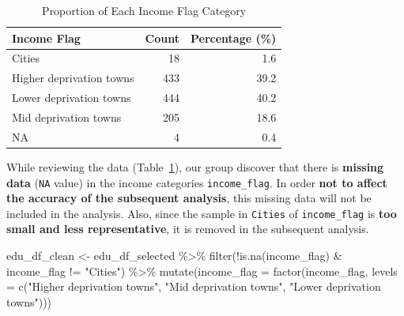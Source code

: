 \documentclass[11pt,en]{../tex/elegantpaper}
\newenvironment{Shaded}{\begin{snugshade}}{\end{snugshade}}
\newcommand{\AttributeTok}[1]{\textcolor[rgb]{0.77,0.63,0.00}{#1}}
\newcommand{\FunctionTok}[1]{\textcolor[rgb]{0.00,0.00,0.81}{#1}}
\newcommand{\NormalTok}[1]{#1}
\newcommand{\OtherTok}[1]{\textcolor[rgb]{0.50,0.00,0.50}{#1}}
\newcommand{\SpecialCharTok}[1]{\textcolor[rgb]{0.00,0.00,0.00}{#1}}
\newcommand{\StringTok}[1]{\textcolor[rgb]{0.31,0.60,0.02}{#1}}
\begin{document}
\begin{longtable}[]{@{}lrr@{}}

\caption{\label{tbl-proportion_of_income}Proportion of Each Income Flag
Category}

\tabularnewline

\toprule\noalign{}
Income Flag & Count & Percentage (\%) \\
\midrule\noalign{}
\endhead
\bottomrule\noalign{}
\endlastfoot
Cities & 18 & 1.6 \\
Higher deprivation towns & 433 & 39.2 \\
Lower deprivation towns & 444 & 40.2 \\
Mid deprivation towns & 205 & 18.6 \\
NA & 4 & 0.4 \\

\end{longtable}

While reviewing the data (Table~\ref{tbl-proportion_of_income}), our
group discover that there is \textbf{missing data} (\texttt{NA} value)
in the income categories \texttt{income\_flag}. In order \textbf{not to
affect the accuracy of the subsequent analysis}, this missing data will
not be included in the analysis. Also, since the sample in
\texttt{Cities} of \texttt{income\_flag} is \textbf{too small and less
representative}, it is removed in the subsequent analysis.

\begin{Shaded}
\begin{Highlighting}[]
\NormalTok{edu\_df\_clean }\OtherTok{\textless{}{-}}\NormalTok{ edu\_df\_selected }\SpecialCharTok{\%\textgreater{}\%}
  \FunctionTok{filter}\NormalTok{(}\SpecialCharTok{!}\FunctionTok{is.na}\NormalTok{(income\_flag) }\SpecialCharTok{\&}\NormalTok{ income\_flag }\SpecialCharTok{!=} \StringTok{"Cities"}\NormalTok{) }\SpecialCharTok{\%\textgreater{}\%}
  \FunctionTok{mutate}\NormalTok{(}\AttributeTok{income\_flag =} \FunctionTok{factor}\NormalTok{(income\_flag,}
                              \AttributeTok{levels =} \FunctionTok{c}\NormalTok{(}\StringTok{"Higher deprivation towns"}\NormalTok{,}
                                         \StringTok{"Mid deprivation towns"}\NormalTok{,}
                                         \StringTok{"Lower deprivation towns"}\NormalTok{)))}
\end{Highlighting}
\end{Shaded}
\end{document}
